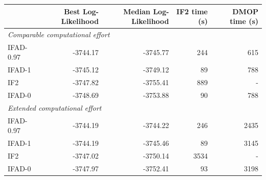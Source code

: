 \begin{tabular}{lrrrr}
\toprule
 & Best Log-Likelihood & Median Log-Likelihood & IF2 time (s) & DMOP time (s) \\
\midrule
\multicolumn{5}{l}{\textit{Comparable computational effort}} \\
\midrule
IFAD-0.97 & -3744.17 & -3745.77 & 244 & 615 \\
IFAD-1 & -3745.12 & -3749.12 & 89 & 788 \\
IF2 & -3747.82 & -3755.41 & 889 & - \\
IFAD-0 & -3748.69 & -3753.88 & 90 & 788 \\
\midrule
\multicolumn{5}{l}{\textit{Extended computational effort}} \\
\midrule
IFAD-0.97 & -3744.19 & -3744.22 & 246 & 2435 \\
IFAD-1 & -3744.19 & -3745.46 & 89 & 3145 \\
IF2 & -3747.02 & -3750.14 & 3534 & - \\
IFAD-0 & -3747.97 & -3752.41 & 93 & 3198 \\
\bottomrule
\end{tabular}
